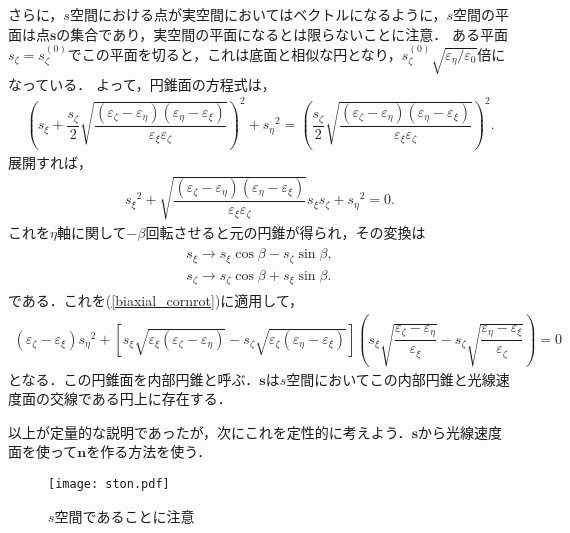 さらに，$s$空間における点が実空間においてはベクトルになるように，$s$空間の平面は点$\boldsymbol{s}$の集合であり，実空間の平面になるとは限らないことに注意．
ある平面$s_\zeta=s_\zeta^{(0)}$でこの平面を切ると，これは底面と相似な円となり，$s_\zeta^{(0)}\sqrt{\varepsilon_\eta/\varepsilon_0}$倍になっている．
よって，円錐面の方程式は，
\begin{align*}
  \left(s_\xi+\dfrac{s_\zeta}{2}\sqrt{\dfrac{(\varepsilon_\zeta-\varepsilon_\eta)(\varepsilon_\eta-\varepsilon_\xi)}{\varepsilon_\xi\varepsilon_\zeta}}\right)^2+{s_\eta}^2=\left(\dfrac{s_\zeta}{2}\sqrt{\dfrac{(\varepsilon_\zeta-\varepsilon_\eta)(\varepsilon_\eta-\varepsilon_\xi)}{\varepsilon_\xi\varepsilon_\zeta}}\right)^2 .
\end{align*}
展開すれば，
\begin{align}
  {s_\xi}^2+\sqrt{\dfrac{(\varepsilon_\zeta-\varepsilon_\eta)(\varepsilon_\eta-\varepsilon_\xi)}{\varepsilon_\xi\varepsilon_\zeta}}s_\xi{}s_\zeta+{s_\eta}^2=0 . \label{biaxial_cornrot}
\end{align}
これを$\eta$軸に関して$-\beta$回転させると元の円錐が得られ，その変換は
\begin{align}
  \begin{split}
    s_\xi \to s_\xi\cos\beta-s_\zeta\sin\beta , \\
    s_\zeta \to s_\zeta\cos\beta+s_\xi\sin\beta .
  \end{split}
\end{align}
である．これを(\ref{biaxial_cornrot})に適用して，
\begin{align}
  (\varepsilon_\zeta-\varepsilon_\xi){s_\eta}^2 +
  \left[s_\xi\sqrt{\varepsilon_\xi(\varepsilon_\zeta-\varepsilon_\eta)} - s_\zeta\sqrt{\varepsilon_\zeta(\varepsilon_\eta-\varepsilon_\xi)}\right]
  \left(s_\xi\sqrt{\dfrac{\varepsilon_\zeta-\varepsilon_\eta}{\varepsilon_\xi}}-s_\zeta\sqrt{\dfrac{\varepsilon_\eta-\varepsilon_\xi}{\varepsilon_\zeta}}\right) = 0\label{biaxial_corn}
\end{align}
となる．この円錐面を内部円錐と呼ぶ．$\boldsymbol{s}$は$s$空間においてこの内部円錐と光線速度面の交線である円上に存在する．

以上が定量的な説明であったが，次にこれを定性的に考えよう．$\boldsymbol{s}$から光線速度面を使って$\boldsymbol{n}$を作る方法を使う．

\begin{figure}[ht]
  \centering
  \texttt{[image: ston.pdf]}
  \caption{ $s$空間であることに注意}
  \label{ston}
\end{figure}

